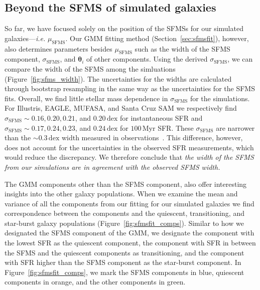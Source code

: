 \documentclass[preprint2,tighten]{aastex62}
\begin{document}
\subsection{Beyond the SFMS of simulated galaxies}
So far, we have focused solely on the position of the SFMSs for our simulated
galaxies---\emph{i.e.} $\mu_\mathrm{SFMS}$. Our GMM fitting method 
(Section~\ref{sec:sfmsfit}), however, also determines parameters besides
$\mu_\mathrm{SFMS}$ such as the width of the SFMS component, $\sigma_\mathrm{SFMS}$, 
and $\bm{\theta}_i$ of other components. Using the derived $\sigma_\mathrm{SFMS}$, 
we can compare the width of the SFMS among the simluations 
(Figure~\ref{fig:sfms_width}). The uncertainties for the widths are 
calculated through bootstrap resampling in the same way as the 
uncertainties for the SFMS fits. Overall, we find little stellar mass 
dependence in $\sigma_\mathrm{SFMS}$ for the simulations. For Illustris, 
EAGLE, MUFASA, and Santa Cruz SAM we respectively find 
$\sigma_\mathrm{SFMS} \sim 0.16, 0.20, 0.21$, and $0.20\,\mathrm{dex}$ 
for instantaneous SFR and
$\sigma_\mathrm{SFMS} \sim 0.17, 0.24, 0.23$, and $0.24\,\mathrm{dex}$
for $100\,\mathrm{Myr}$ SFR. These $\sigma_\mathrm{SFMS}$ are narrower 
than the ${\sim}0.3\,\mathrm{dex}$ width measured in 
observations~\citep[\emph{e.g.}][]{daddi2007, noeske2007, magdis12, whittaker12}. 
This difference, however, does not account for the uncertainties in the 
observed SFR measurements, which would reduce the discrepancy. We 
therefore conclude that \emph{the width of the SFMS from our 
simulations are in agreement with the observed SFMS width.}

The GMM components other than the SFMS component, also offer interesting
insights into the other galaxy populations. When we examine the mean and 
variance of all the components from our fitting for our simulated galaxies 
we find correspondence between the components and the quiescent, 
transitioning, and star-burst galaxy populations (Figure~\ref{fig:sfmsfit_comps}).
Similar to how we designated the SFMS component of the GMM, we 
designate the component with the lowest SFR as the quiescent 
component, the component with SFR in between the SFMS and the quiescent 
components as transitioning, and the component with SFR higher than the 
SFMS component as the star-burst component. In Figure~\ref{fig:sfmsfit_comps}, 
we mark the SFMS components in blue, quiescent components in orange, and 
the other components in green. 
\end{document}
